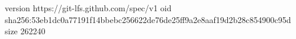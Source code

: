 version https://git-lfs.github.com/spec/v1
oid sha256:53eb1dc0a77191f14bbebc256622de76de25ff9a2e8aaf19d2b28c854900c95d
size 262240

